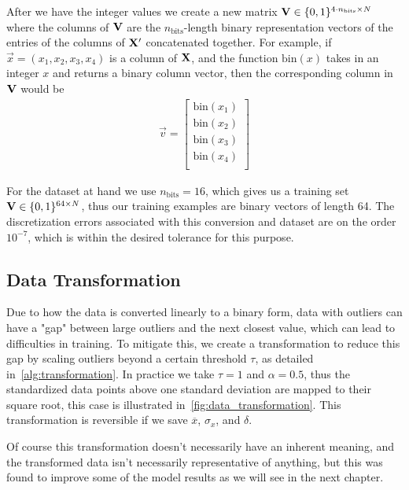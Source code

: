After we have the integer values we create a new matrix \( \mathbf{V} \in \{0,1\}^{4\cdot n_\text{bits} \times N} \) where the columns of \( \mathbf{V} \) are the \( n_\text{bits} \)-length binary representation vectors of the entries of the columns of \( \mathbf{X}' \) concatenated together.
For example, if \( \vec{x} = (x_1,x_2,x_3,x_4) \) is a column of \( \mathbf{X} \), and the function \( \text{bin}(x) \) takes in an integer \( x \) and returns a binary column vector, then the corresponding column in \( \mathbf{V} \) would be
\begin{align}
    \vec{v} = \begin{bmatrix}
        \text{bin}(x_1) \\
        \text{bin}(x_2) \\
        \text{bin}(x_3) \\
        \text{bin}(x_4) \\
    \end{bmatrix}
\end{align}

For the dataset at hand we use \( n_\text{bits} = 16 \), which gives us a training set \( \mathbf{V} \in \{0,1\}^{64 \times N} \), thus our training examples are binary vectors of length 64.
The discretization errors associated with this conversion and dataset are on the order \( 10^{-7} \), which is within the desired tolerance for this purpose.

\subsection{Data Transformation}
Due to how the data is converted linearly to a binary form, data with outliers can have a "gap" between large outliers and the next closest value, which can lead to difficulties in training.
To mitigate this, we create a transformation to reduce this gap by scaling outliers beyond a certain threshold \( \tau \), as detailed in~\cref{alg:transformation}.
In practice we take \( \tau = 1 \) and \( \alpha = 0.5 \), thus the standardized data points above one standard deviation are mapped to their square root, this case is illustrated in~\cref{fig:data_transformation}.
This transformation is reversible if we save \( \overline{x} \), \( \sigma_x \), and \( \delta \).

Of course this transformation doesn't necessarily have an inherent meaning, and the transformed data isn't necessarily representative of anything, but this was found to improve some of the model results as we will see in the next chapter.


